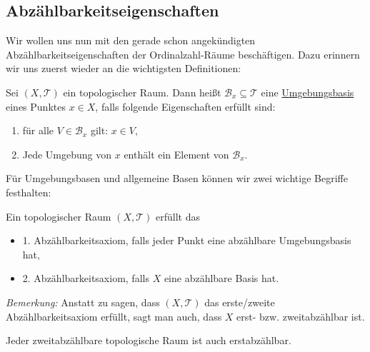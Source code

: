\documentclass[11pt]{scrartcl}
\begin{document}
\subsection{Abzählbarkeitseigenschaften}
Wir wollen uns nun mit den gerade schon angekündigten Abzählbarkeitseigenschaften der Ordinalzahl-Räume
beschäftigen. Dazu erinnern wir uns zuerst wieder an die wichtigsten Definitionen:
\begin{definition}
	Sei $(X,\mathcal T)$  ein topologischer Raum. 
	Dann heißt $\mathcal B_x \subseteq \mathcal T$ 
	eine \underline{Umgebungsbasis} eines Punktes $x\in X$, falls folgende Eigenschaften erfüllt
	sind:
	\begin{enumerate}
		\item für alle $V\in \mathcal B_x$ gilt: $x\in V$,
		\item Jede Umgebung von $x$ enthält ein Element von $\mathcal B_x$.
	\end{enumerate}
\end{definition}
\noindent Für Umgebungsbasen und allgemeine Basen können wir zwei wichtige Begriffe festhalten:
\begin{definition}
	Ein topologischer Raum $(X,\mathcal T)$ erfüllt das \begin{itemize}
		\item 1. Abzählbarkeitsaxiom, falls jeder Punkt eine abzählbare Umgebungsbasis hat,
		\item 2. Abzählbarkeitsaxiom, falls $X$ eine abzählbare Basis hat.
	\end{itemize}
\end{definition}
\noindent \textit{Bemerkung:} Anstatt zu sagen, dass $(X,\mathcal T)$ das erste/zweite 
Abzählbarkeitsaxiom erfüllt, sagt man auch, dass $X$ erst- bzw. zweitabzählbar ist.
\begin{lemma}
	Jeder zweitabzählbare topologische Raum ist auch erstabzählbar.
\end{lemma}
\end{document}
